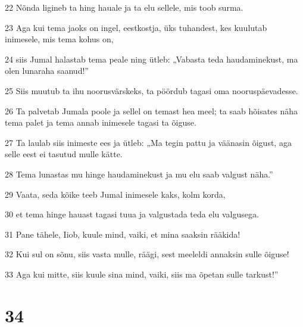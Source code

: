 \par 22 Nõnda ligineb ta hing hauale ja ta elu sellele, mis toob surma.
\par 23 Aga kui tema jaoks on ingel, eestkostja, üks tuhandest, kes kuulutab inimesele, mis tema kohus on,
\par 24 siis Jumal halastab tema peale ning ütleb: „Vabasta teda haudaminekust, ma olen lunaraha saanud!”
\par 25 Siis muutub ta ihu noorusvärskeks, ta pöördub tagasi oma nooruspäevadesse.
\par 26 Ta palvetab Jumala poole ja sellel on temast hea meel; ta saab hõisates näha tema palet ja tema annab inimesele tagasi ta õiguse.
\par 27 Ta laulab siis inimeste ees ja ütleb: „Ma tegin pattu ja väänasin õigust, aga selle eest ei tasutud mulle kätte.
\par 28 Tema lunastas mu hinge haudaminekust ja mu elu saab valgust näha.”
\par 29 Vaata, seda kõike teeb Jumal inimesele kaks, kolm korda,
\par 30 et tema hinge hauast tagasi tuua ja valgustada teda elu valgusega.
\par 31 Pane tähele, Iiob, kuule mind, vaiki, et mina saaksin rääkida!
\par 32 Kui sul on sõnu, siis vasta mulle, räägi, sest meeleldi annaksin sulle õiguse!
\par 33 Aga kui mitte, siis kuule sina mind, vaiki, siis ma õpetan sulle tarkust!”

\chapter{34}


